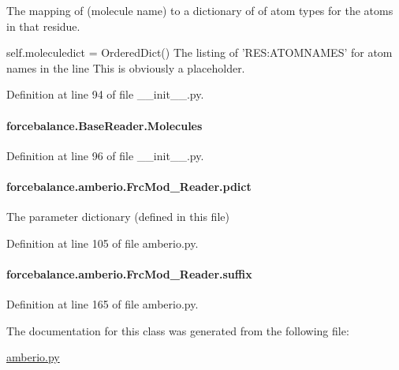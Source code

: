 The mapping of (molecule name) to a dictionary of of atom types for the atoms in that residue. 

self.\-moleculedict = Ordered\-Dict() The listing of 'R\-E\-S\-:A\-T\-O\-M\-N\-A\-M\-E\-S' for atom names in the line This is obviously a placeholder. 

Definition at line 94 of file \-\_\-\-\_\-init\-\_\-\-\_\-.\-py.

\hypertarget{classforcebalance_1_1BaseReader_a4369b5fb663a83b11602daa71db6862e}{
\paragraph[{Molecules}]{\setlength{\rightskip}{0pt plus 5cm}forcebalance.\-Base\-Reader.\-Molecules\hspace{0.3cm}{\ttfamily [inherited]}}}\label{classforcebalance_1_1BaseReader_a4369b5fb663a83b11602daa71db6862e}


Definition at line 96 of file \-\_\-\-\_\-init\-\_\-\-\_\-.\-py.

\hypertarget{classforcebalance_1_1amberio_1_1FrcMod__Reader_a2d62765145dd710032844ac8d7ec8a34}{
\paragraph[{pdict}]{\setlength{\rightskip}{0pt plus 5cm}forcebalance.\-amberio.\-Frc\-Mod\-\_\-\-Reader.\-pdict}}\label{classforcebalance_1_1amberio_1_1FrcMod__Reader_a2d62765145dd710032844ac8d7ec8a34}


The parameter dictionary (defined in this file) 



Definition at line 105 of file amberio.\-py.

\hypertarget{classforcebalance_1_1amberio_1_1FrcMod__Reader_a4757a1ec953e5be7f8593071e0698731}{
\paragraph[{suffix}]{\setlength{\rightskip}{0pt plus 5cm}forcebalance.\-amberio.\-Frc\-Mod\-\_\-\-Reader.\-suffix}}\label{classforcebalance_1_1amberio_1_1FrcMod__Reader_a4757a1ec953e5be7f8593071e0698731}


Definition at line 165 of file amberio.\-py.



The documentation for this class was generated from the following file\-:\begin{DoxyCompactItemize}
\item 
\hyperlink{amberio_8py}{amberio.\-py}\end{DoxyCompactItemize}
